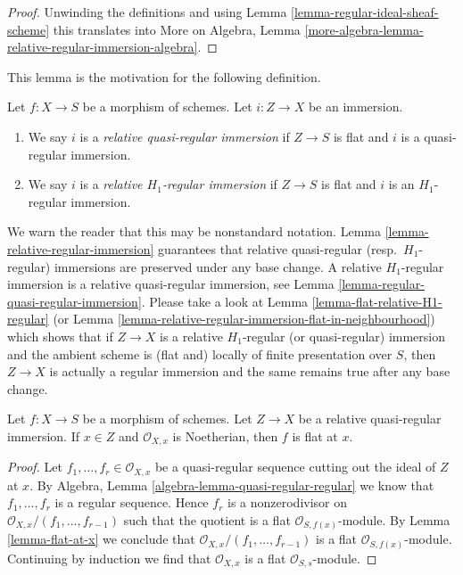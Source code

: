 \begin{proof}
Unwinding the definitions and using
Lemma \ref{lemma-regular-ideal-sheaf-scheme}
this translates into More on Algebra, Lemma
\ref{more-algebra-lemma-relative-regular-immersion-algebra}.
\end{proof}

\noindent
This lemma is the motivation for the following definition.

\begin{definition}
\label{definition-relative-H1-regular-immersion}
Let $f : X \to S$ be a morphism of schemes.
Let $i : Z \to X$ be an immersion.
\begin{enumerate}
\item We say $i$ is a {\it relative quasi-regular immersion}
if $Z \to S$ is flat and $i$ is a quasi-regular immersion.
\item We say $i$ is a {\it relative $H_1$-regular immersion}
if $Z \to S$ is flat and $i$ is an $H_1$-regular immersion.
\end{enumerate}
\end{definition}

\noindent
We warn the reader that this may be nonstandard notation.
Lemma \ref{lemma-relative-regular-immersion}
guarantees that relative quasi-regular (resp.\ $H_1$-regular)
immersions are preserved under any base change.
A relative $H_1$-regular immersion is a relative quasi-regular immersion, see
Lemma \ref{lemma-regular-quasi-regular-immersion}.
Please take a look at
Lemma \ref{lemma-flat-relative-H1-regular}
(or
Lemma \ref{lemma-relative-regular-immersion-flat-in-neighbourhood})
which shows that if $Z \to X$ is a relative $H_1$-regular
(or quasi-regular) immersion and the ambient scheme is (flat and)
locally of finite presentation over $S$, then $Z \to X$
is actually a regular immersion and the same remains true after
any base change.

\begin{lemma}
\label{lemma-quasi-regular-immersion-flat-at-x}
Let $f : X \to S$ be a morphism of schemes.
Let $Z \to X$ be a relative quasi-regular immersion.
If $x \in Z$ and $\mathcal{O}_{X, x}$ is Noetherian, then $f$ is flat at $x$.
\end{lemma}

\begin{proof}
Let $f_1, \ldots, f_r \in \mathcal{O}_{X, x}$ be a quasi-regular
sequence cutting out the ideal of $Z$ at $x$. By
Algebra, Lemma \ref{algebra-lemma-quasi-regular-regular}
we know that $f_1, \ldots, f_r$ is a regular sequence.
Hence $f_r$ is a nonzerodivisor on
$\mathcal{O}_{X, x}/(f_1, \ldots, f_{r - 1})$ such that the
quotient is a flat $\mathcal{O}_{S, f(x)}$-module.
By
Lemma \ref{lemma-flat-at-x}
we conclude that $\mathcal{O}_{X, x}/(f_1, \ldots, f_{r - 1})$
is a flat $\mathcal{O}_{S, f(x)}$-module.
Continuing by induction we find that $\mathcal{O}_{X, x}$
is a flat $\mathcal{O}_{S, s}$-module.
\end{proof}

